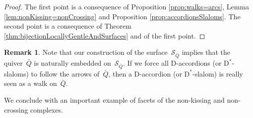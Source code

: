 \documentclass{amsart}
\theoremstyle{definition}
\newtheorem{remark}[theorem]{Remark}
\newcommand{\surface}{\mathcal{S}} %
\newcommand{\dual}{^*} %
\newcommand{\dissection}{\mathrm{D}} %
\begin{document}
\begin{proof}
 The first point is a consequence of Proposition \ref{prop:walks=arcs}, Lemma \ref{lem:nonKissing=nonCrossing} and Proposition \ref{prop:accordionsSlaloms}.
 The second point is a consequence of Theorem \ref{thm:bijectionLocallyGentleAndSurfaces} and of the first point.
\end{proof}

\begin{remark}
Note that our construction of the surface~$\surface_{\bar Q}$ implies that the quiver~$\bar Q$ is naturally embedded on~$\surface_{\bar Q}$.
If we force all $\dissection$-accordions (or $\dissection\dual$-slaloms) to follow the arrows of~$\bar Q$, then a $\dissection$-accordion (or $\dissection\dual$-slalom) is really seen as a walk on~$\bar Q$.
\end{remark}

We conclude with an important example of facets of the non-kissing and non-crossing complexes.
\end{document}
